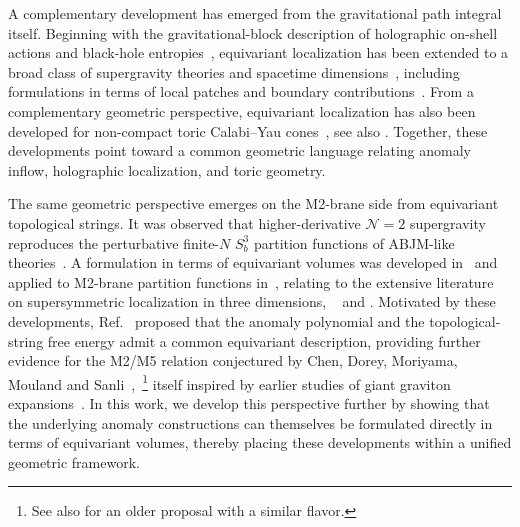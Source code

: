 \documentclass[11pt,a4paper]{article}
\theoremstyle{definition}
\theoremstyle{identity}
\theoremstyle{remark}
\begin{document}
A complementary development has emerged from the gravitational path integral itself. Beginning with the gravitational-block description of holographic on-shell actions and black-hole entropies~\cite{Hosseini:2019iad,BenettiGenolini:2019jdz,BenettiGenolini:2023kxp}, equivariant localization has been extended to a broad class of supergravity theories and spacetime dimensions~\cite{BenettiGenolini:2024lbj,BenettiGenolini:2024kyy,BenettiGenolini:2026qdm,Galli:2026lsl}, including formulations in terms of local patches and boundary contributions~\cite{Cassani:2024kjn,Colombo:2025ihp,Colombo:2025yqy}. From a complementary geometric perspective, equivariant localization has also been developed for non-compact toric Calabi--Yau cones~\cite{Martelli:2023oqk,Colombo:2023fhu}, see also \cite{Nekrasov:2021ked,Cassia:2022lfj}. Together, these developments point toward a common geometric language relating anomaly inflow, holographic localization, and toric geometry.

The same geometric perspective emerges on the M2-brane side from equivariant topological strings. It was observed that higher-derivative $\mathcal N=2$ supergravity reproduces the perturbative finite-$N$ $S^3_b$ partition functions of ABJM-like theories~\cite{Bobev:2021oku,Hristov:2021qsw,Hristov:2022lcw}. A formulation in terms of equivariant volumes was developed in~\cite{Cassia:2025aus} and applied to M2-brane partition functions in~\cite{Cassia:2025jkr}, relating to the extensive literature on supersymmetric localization in three dimensions, ~\cite{Kapustin:2009kz,Drukker:2010nc,Hama:2011ea,Marino:2011eh,Hatsuda:2013oxa,Nosaka:2015iiw,Hatsuda:2016uqa,Chester:2021gdw,Geukens:2024zmt,Kubo:2024qhq,Bobev:2025ltz,Hristov:2026zjh,Hong:2026zul} and \cite{Kim:2009wb,Kapustin:2011jm,Beem:2012mb,Benini:2015noa,Benini:2015eyy,Hosseini:2016tor,Hosseini:2016ume,Hosseini:2022vho,Bobev:2022eus,Bobev:2024mqw,Inglese:2023wky,Colombo:2024mts}. Motivated by these developments, Ref.~\cite{Hristov:2026tde} proposed that the anomaly polynomial and the topological-string free energy admit a common equivariant description, providing further evidence for the M2/M5 relation conjectured by Chen, Dorey, Moriyama, Mouland and Sanli~\cite{Chen:2026fpe},~\footnote{See also \cite{Batrachenko:2002pu} for an older proposal with a similar flavor.} itself inspired by earlier studies of giant graviton expansions~\cite{Gaiotto:2021xce,Imamura:2021ytr,Hayashi:2024aaf}. In this work, we develop this perspective further by showing that the underlying anomaly constructions can themselves be formulated directly in terms of equivariant volumes, thereby placing these developments within a unified geometric framework.
\end{document}
